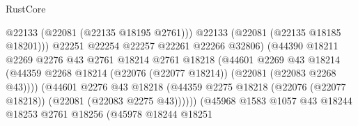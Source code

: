 \begin{lexlean}{RustCore}
\begin{coremodule}
                                                @22133
                                                (@22081 (@22135 @18195 @2761)))
                                              @22133
                                              (@22081 (@22135 @18185 @18201)))
                                            @22251
                                            @22254
                                            @22257
                                            @22261
                                            @22266
                                            @32806)
                                          (@44390
                                            @18211
                                            @2269
                                            @2276
                                            @43
                                            @2761
                                            @18214
                                            @2761
                                            @18218
                                            (@44601
                                              @2269
                                              @43
                                              @18214
                                              (@44359
                                                @2268
                                                @18214
                                                (@22076 (@22077 @18214))
                                                (@22081 (@22083 @2268 @43))))
                                            (@44601
                                              @2276
                                              @43
                                              @18218
                                              (@44359
                                                @2275
                                                @18218
                                                (@22076 (@22077 @18218))
                                                (@22081 (@22083 @2275 @43))))))
                                        (@45968
                                          @1583
                                          @1057
                                          @43
                                          @18244
                                          @18253
                                          @2761
                                          @18256
                                          (@45978
                                            @18244
                                            @18251

\end{coremodule}
\end{lexlean}
